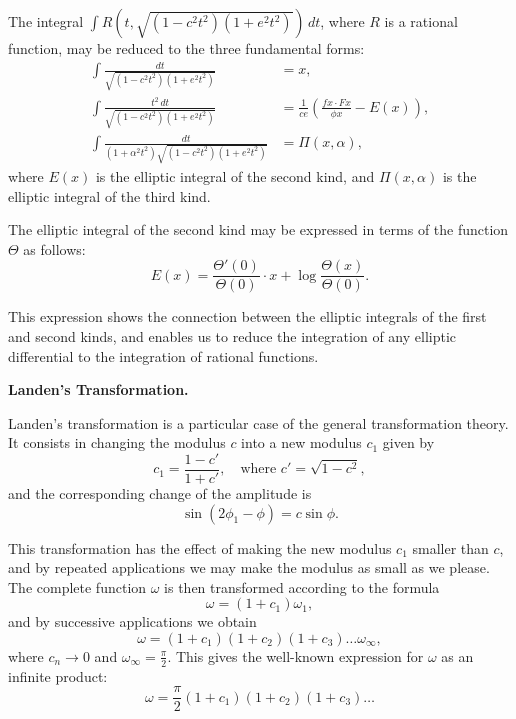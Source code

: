\documentclass[11pt,a4paper]{book}
\begin{document}
\newpage
\setcounter{page}{149}

The integral $\int R(t, \sqrt{(1 - c^2 t^2)(1 + e^2 t^2)})\, dt$, where $R$ is a rational function,
may be reduced to the three fundamental forms:
\begin{align*}
\int \frac{dt}{\sqrt{(1 - c^2 t^2)(1 + e^2 t^2)}} &= x,\\
\int \frac{t^2\,dt}{\sqrt{(1 - c^2 t^2)(1 + e^2 t^2)}} &= \frac{1}{ce}\left(\frac{f x \cdot F x}{\phi x} - E(x)\right),\\
\int \frac{dt}{(1 + \alpha^2 t^2)\sqrt{(1 - c^2 t^2)(1 + e^2 t^2)}} &= \Pi(x, \alpha),
\end{align*}
where $E(x)$ is the elliptic integral of the second kind, and $\Pi(x, \alpha)$ is the elliptic
integral of the third kind.

\newpage
\setcounter{page}{150}

The elliptic integral of the second kind may be expressed in terms of the function
$\Theta$ as follows:
\[
E(x) = \frac{\Theta'(0)}{\Theta(0)} \cdot x + \log \frac{\Theta(x)}{\Theta(0)}.
\]

This expression shows the connection between the elliptic integrals of the first and
second kinds, and enables us to reduce the integration of any elliptic differential to
the integration of rational functions.

\medskip

\textbf{Landen's Transformation.}

Landen's transformation is a particular case of the general transformation theory.
It consists in changing the modulus $c$ into a new modulus $c_1$ given by
\[
c_1 = \frac{1 - c'}{1 + c'},\quad \text{where } c' = \sqrt{1 - c^2},
\]
and the corresponding change of the amplitude is
\[
\sin(2\phi_1 - \phi) = c \sin \phi.
\]

\newpage
\setcounter{page}{151}

This transformation has the effect of making the new modulus $c_1$ smaller than $c$,
and by repeated applications we may make the modulus as small as we please. The
complete function $\omega$ is then transformed according to the formula
\[
\omega = (1 + c_1)\omega_1,
\]
and by successive applications we obtain
\[
\omega = (1 + c_1)(1 + c_2)(1 + c_3)\ldots \omega_{\infty},
\]
where $c_n \to 0$ and $\omega_{\infty} = \frac{\pi}{2}$. This gives the well-known expression for $\omega$ as an infinite
product:
\[
\omega = \frac{\pi}{2} (1 + c_1)(1 + c_2)(1 + c_3) \ldots
\]

\newpage
\setcounter{page}{152}
\end{document}
